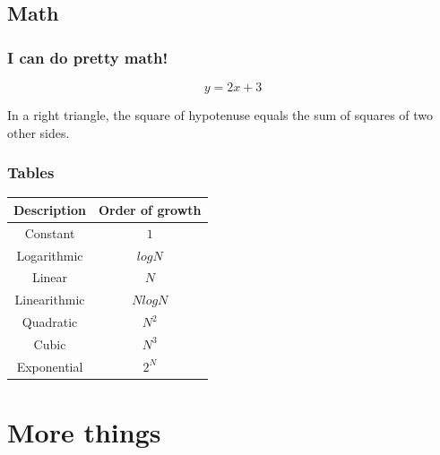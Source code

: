 \documentclass{beamer}
\begin{document}
\subsection{Math}
\begin{frame}
  \frametitle{I can do pretty math!}
	\begin{equation}
	y = 2x + 3
	\end{equation}
    \begin{theorem}
  		In a right triangle, the square of hypotenuse equals
  		the sum of squares of two other sides.
	\end{theorem}

\end{frame}
\begin{frame}
  \frametitle{Tables}
  \begin{center}
	\begin{tabular}{|c|c|}
		\hline 
        \textbf{Description} & \textbf{Order of growth} \\
        \hline 
        Constant & $1$ \\
        Logarithmic & $log N$ \\
        Linear & $N$ \\
        Linearithmic & $N log N$ \\
        Quadratic & $N^2$ \\
        Cubic & $N^3$ \\
        Exponential & $2^N$\\
        \hline
    \end{tabular}
    \end{center}
\end{frame}
\section{More things}
\end{document}

